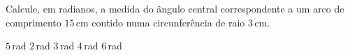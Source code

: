 Calcule, em radianos, a medida do ângulo central correspondente a um arco de comprimento $15$\,cm contido numa circunferência de raio $3$\,cm.

$5$\,rad
$2$\,rad
$3$\,rad
$4$\,rad
$6$\,rad



